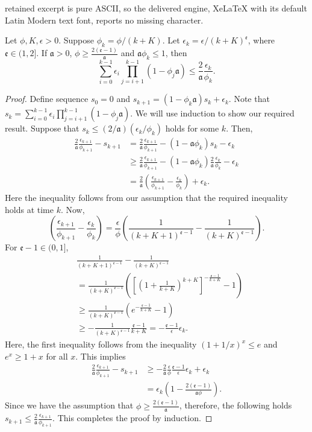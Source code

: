 \documentclass[10pt,a4paper]{amsart}
\newcommand{\afrak}{\mathfrak{a}}
\newcommand{\efrak}{\mathfrak{e}}
\begin{document}
retained excerpt is pure ASCII, so the delivered engine, XeLaTeX with its default Latin Modern text font, reports no missing character.
\begin{lemma}\label{lemma:aux2}
    Let $\phi,K, \epsilon>0$. Suppose $\phi_k=\phi/(k+K)$. Let $\epsilon_k=\epsilon/(k+K)^{\efrak}$, where $\efrak\in (1,2]$. If $\afrak> 0$, $\phi\geq \frac{2(\efrak-1)}{\afrak}$ and $\afrak\phi_k\leq 1$, then 
    $$\sum_{i=0}^{k-1}\epsilon_i\prod_{j=i+1}^{k-1}(1-\phi_j\afrak)\leq \frac{2}{\afrak}\frac{\epsilon_k}{\phi_k}.$$
\end{lemma}

\begin{proof}
    Define sequence $s_{0}=0$ and $s_{k+1}=(1-\phi_k\afrak)s_k+\epsilon_k$. Note that $s_k=\sum_{i=0}^{k-1}\epsilon_i\prod_{j=i+1}^{k-1}(1-\phi_j\afrak)$. We will use induction to show our required result. Suppose that $s_k\leq (2/\afrak)(\epsilon_k/\phi_k)$ holds for some $k$. Then,
    \begin{align*}
        \frac{2}{\afrak}\frac{\epsilon_{k+1}}{\phi_{k+1}}-s_{k+1}&=\frac{2}{\afrak}\frac{\epsilon_{k+1}}{\phi_{k+1}}-(1-\afrak\phi_k)s_k-\epsilon_k\\
        &\geq \frac{2}{\afrak}\frac{\epsilon_{k+1}}{\phi_{k+1}}-(1-\afrak\phi_k)\frac{2}{\afrak}\frac{\epsilon_k}{\phi_k}-\epsilon_k\\
        &=\frac{2}{\afrak}\left(\frac{\epsilon_{k+1}}{\phi_{k+1}}-\frac{\epsilon_k}{\phi_k}\right)+\epsilon_k.
    \end{align*}
    Here the inequality follows from our assumption that the required inequality holds at time $k$.
    Now,
    $$\left(\frac{\epsilon_{k+1}}{\phi_{k+1}}-\frac{\epsilon_k}{\phi_k}\right)=\frac{\epsilon}{\phi}\left(\frac{1}{(k+K+1)^{\efrak-1}}-\frac{1}{(k+K)^{\efrak-1}}\right).$$
    For $\efrak-1\in(0,1]$,
    \begin{align*}
        &\frac{1}{(k+K+1)^{\efrak-1}}-\frac{1}{(k+K)^{\efrak-1}}\\
        &=\frac{1}{(k+K)^{\efrak-1}}\left(\left[\left(1+\frac{1}{k+K}\right)^{k+K}\right]^{-\frac{\efrak-1}{k+K}}-1\right)\\
        &\geq \frac{1}{(k+K)^{\efrak-1}}\left(e^{-\frac{\efrak-1}{k+K}}-1\right)\\
        &\geq -\frac{1}{(k+K)^{\efrak-1}}\frac{\efrak-1}{k+K}=-\frac{\efrak-1}{\epsilon}\epsilon_k.
    \end{align*}
    Here, the first inequality follows from the inequality $(1+1/x)^x\leq e$ and $e^x\geq 1+x$ for all $x$. This implies 
    \begin{align*}
        \frac{2}{\afrak}\frac{\epsilon_{k+1}}{\phi_{k+1}}-s_{k+1}&\geq -\frac{2}{\afrak}\frac{\epsilon}{\phi}\frac{\efrak-1}{\epsilon}\epsilon_k+\epsilon_k\\
        &=\epsilon_k\left(1-\frac{2(\efrak-1)}{\afrak\phi}\right).
    \end{align*}
    Since we have the assumption that $\phi\geq \frac{2(\efrak-1)}{\afrak}$, therefore, the following holds $s_{k+1}\leq \frac{2}{\afrak}\frac{\epsilon_{k+1}}{\phi_{k+1}}$. This completes the proof by induction.
\end{proof}
\end{document}
